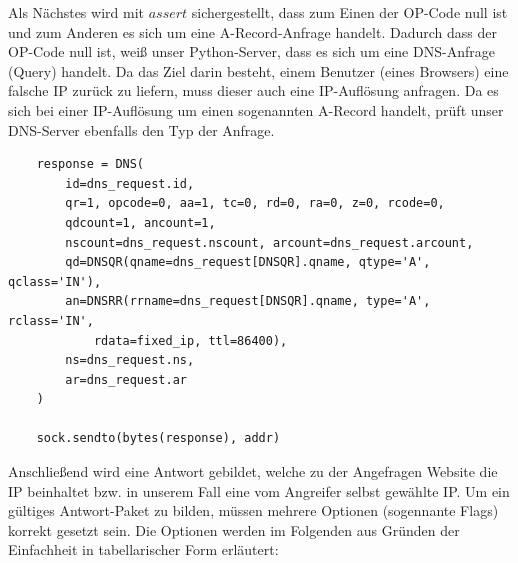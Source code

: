 \documentclass[10pt,a4paper]{article}
\begin{document}
Als Nächstes wird mit $\mathit{assert}$ sichergestellt, dass zum Einen der OP-Code null ist und zum Anderen es sich um eine A-Record-Anfrage handelt. Dadurch dass der OP-Code null ist, weiß unser Python-Server, dass es sich um eine DNS-Anfrage (Query) handelt. Da das Ziel darin besteht, einem Benutzer (eines Browsers) eine falsche IP zurück zu liefern, muss dieser auch eine IP-Auflösung anfragen. Da es sich bei einer IP-Auflösung um einen sogenannten A-Record handelt, prüft unser DNS-Server ebenfalls den Typ der Anfrage.
\begin{center}
\begin{lstlisting}
    response = DNS(
        id=dns_request.id,
        qr=1, opcode=0, aa=1, tc=0, rd=0, ra=0, z=0, rcode=0,  
        qdcount=1, ancount=1,
        nscount=dns_request.nscount, arcount=dns_request.arcount,
        qd=DNSQR(qname=dns_request[DNSQR].qname, qtype='A', qclass='IN'),
        an=DNSRR(rrname=dns_request[DNSQR].qname, type='A', rclass='IN', 
        	rdata=fixed_ip, ttl=86400),
        ns=dns_request.ns,
        ar=dns_request.ar
    )

    sock.sendto(bytes(response), addr)
\end{lstlisting}
\end{center}
Anschließend wird eine Antwort gebildet, welche zu der Angefragen Website die IP beinhaltet bzw. in unserem Fall eine vom Angreifer selbst gewählte IP. Um ein gültiges Antwort-Paket zu bilden, müssen mehrere Optionen (sogennante Flags) korrekt gesetzt sein. Die Optionen werden im Folgenden aus Gründen der Einfachheit in tabellarischer Form erläutert:
\end{document}
